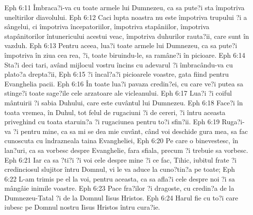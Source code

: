 Eph 6:11  Îmbraca?i-va cu toate armele lui Dumnezeu, ca sa pute?i sta împotriva uneltirilor diavolului.
Eph 6:12  Caci lupta noastra nu este împotriva trupului ?i a sângelui, ci împotriva începatoriilor, împotriva stapâniilor, împotriva stapânitorilor întunericului acestui veac, împotriva duhurilor rauta?ii, care sunt în vazduh.
Eph 6:13  Pentru aceea, lua?i toate armele lui Dumnezeu, ca sa pute?i împotriva în ziua cea rea, ?i, toate biruindu-le, sa ramâne?i în picioare.
Eph 6:14  Sta?i deci tari, având mijlocul vostru încins cu adevarul ?i îmbracându-va cu plato?a drepta?ii,
Eph 6:15  ?i încal?a?i picioarele voastre, gata fiind pentru Evanghelia pacii.
Eph 6:16  În toate lua?i pavaza credin?ei, cu care ve?i putea sa stinge?i toate sage?ile cele arzatoare ale vicleanului.
Eph 6:17  Lua?i ?i coiful mântuirii ?i sabia Duhului, care este cuvântul lui Dumnezeu.
Eph 6:18  Face?i în toata vremea, în Duhul, tot felul de rugaciuni ?i de cereri, ?i întru aceasta priveghind cu toata staruin?a ?i rugaciunea pentru to?i sfin?ii.
Eph 6:19  Ruga?i-va ?i pentru mine, ca sa mi se dea mie cuvânt, când voi deschide gura mea, sa fac cunoscuta cu îndrazneala taina Evangheliei,
Eph 6:20  Pe care o binevestesc, în lan?uri, ca sa vorbesc despre Evanghelie, fara sfiala, precum ?i trebuie sa vorbesc.
Eph 6:21  Iar ca sa ?ti?i ?i voi cele despre mine ?i ce fac, Tihic, iubitul frate ?i credinciosul slujitor întru Domnul, vi le va aduce la cuno?tin?a pe toate;
Eph 6:22  L-am trimis pe el la voi, pentru aceasta, ca sa afla?i cele despre noi ?i sa mângâie inimile voastre.
Eph 6:23  Pace fra?ilor ?i dragoste, cu credin?a de la Dumnezeu-Tatal ?i de la Domnul Iisus Hristos.
Eph 6:24  Harul fie cu to?i care iubesc pe Domnul nostru Iisus Hristos întru cura?ie.


